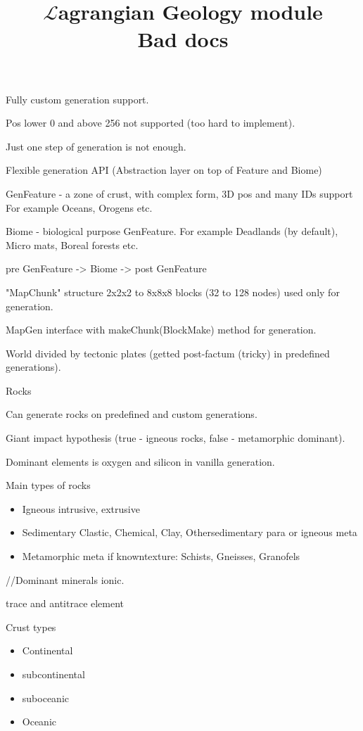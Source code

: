 \documentclass[12pt]{article}
\title{$\mathcal{L}$agrangian Geology module \\ Bad docs}
\begin{document}
    \maketitle

    Fully custom generation support.

    Pos lower 0 and above 256 not supported (too hard to implement).

    Just one step of generation is not enough.

    Flexible generation API (Abstraction layer on top of Feature and Biome)

    GenFeature - a zone of crust, with complex form, 3D pos and many IDs support
    For example Oceans, Orogens etc.

    Biome - biological purpose GenFeature.
    For example Deadlands (by default), Micro mats, Boreal forests etc.

    pre GenFeature -> Biome -> post GenFeature

    "MapChunk" structure 2x2x2 to 8x8x8 blocks (32 to 128 nodes) used only for generation.

    MapGen interface with makeChunk(BlockMake) method for generation.

    World divided by tectonic plates (getted post-factum (tricky) in predefined generations).

    Rocks

    Can generate rocks on predefined and custom generations.  

    Giant impact hypothesis (true - igneous rocks, false - metamorphic dominant).

    Dominant elements is oxygen and silicon in vanilla generation.

    Main types of rocks

    \begin{itemize}
		\item Igneous {intrusive, extrusive}
        \item Sedimentary {Clastic, Chemical, Clay, Other}{sedimentary para or igneous meta}
        \item Metamorphic {meta if known}{texture: Schists, Gneisses, Granofels}
    \end{itemize}
    
    //Dominant minerals ionic.

    trace and antitrace element

    Crust types

    \begin{itemize}
		\item Continental
        \item subcontinental
        \item suboceanic
        \item Oceanic
    \end{itemize}
    
\end{document}
